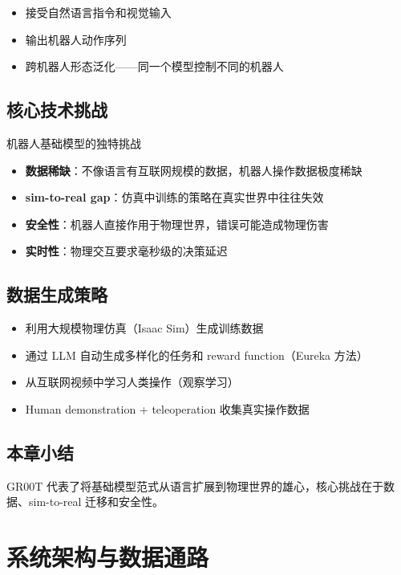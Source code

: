 \documentclass[a4paper]{article}
\begin{document}
\begin{itemize}
    \item 接受自然语言指令和视觉输入
    \item 输出机器人动作序列
    \item 跨机器人形态泛化——同一个模型控制不同的机器人
\end{itemize}

\subsection{核心技术挑战}

\begin{warningbox}{机器人基础模型的独特挑战}
\begin{itemize}
    \item \textbf{数据稀缺}：不像语言有互联网规模的数据，机器人操作数据极度稀缺
    \item \textbf{sim-to-real gap}：仿真中训练的策略在真实世界中往往失效
    \item \textbf{安全性}：机器人直接作用于物理世界，错误可能造成物理伤害
    \item \textbf{实时性}：物理交互要求毫秒级的决策延迟
\end{itemize}
\end{warningbox}

\subsection{数据生成策略}

\begin{itemize}
    \item 利用大规模物理仿真（Isaac Sim）生成训练数据
    \item 通过 LLM 自动生成多样化的任务和 reward function（Eureka 方法）
    \item 从互联网视频中学习人类操作（观察学习）
    \item Human demonstration + teleoperation 收集真实操作数据
\end{itemize}

\subsection{本章小结}

GR00T 代表了将基础模型范式从语言扩展到物理世界的雄心，核心挑战在于数据、sim-to-real 迁移和安全性。

\section{系统架构与数据通路}
\end{document}
